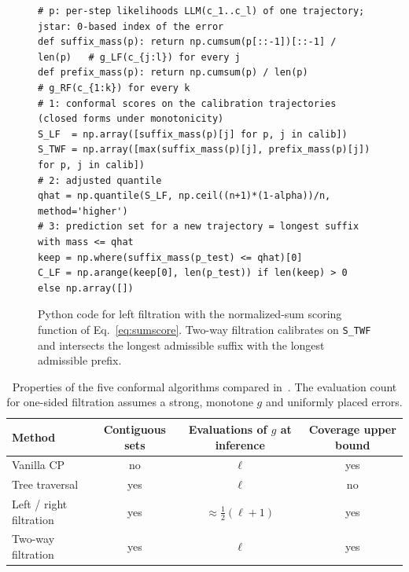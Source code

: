 \documentclass[11pt]{article}
\theoremstyle{definition}
\begin{document}
\begin{figure}[H]
\begin{snugshade}
\begin{Verbatim}
# p: per-step likelihoods LLM(c_1..c_l) of one trajectory; jstar: 0-based index of the error
def suffix_mass(p): return np.cumsum(p[::-1])[::-1] / len(p)   # g_LF(c_{j:l}) for every j
def prefix_mass(p): return np.cumsum(p) / len(p)               # g_RF(c_{1:k}) for every k
# 1: conformal scores on the calibration trajectories (closed forms under monotonicity)
S_LF  = np.array([suffix_mass(p)[j] for p, j in calib])
S_TWF = np.array([max(suffix_mass(p)[j], prefix_mass(p)[j]) for p, j in calib])
# 2: adjusted quantile
qhat = np.quantile(S_LF, np.ceil((n+1)*(1-alpha))/n, method='higher')
# 3: prediction set for a new trajectory = longest suffix with mass <= qhat
keep = np.where(suffix_mass(p_test) <= qhat)[0]
C_LF = np.arange(keep[0], len(p_test)) if len(keep) > 0 else np.array([])
\end{Verbatim}
\end{snugshade}
\caption{Python code for left filtration with the normalized-sum scoring function of Eq.~\eqref{eq:sumscore}. Two-way filtration calibrates on \texttt{S\_TWF} and intersects the longest admissible suffix with the longest admissible prefix.}
\label{fig:code-lf}
\end{figure}

\begin{table}[H]
\centering\small
\begin{tabular}{@{}lccc@{}}\toprule
Method & Contiguous sets & Evaluations of $g$ at inference & Coverage upper bound\\\midrule
Vanilla CP & no & $\ell$ & yes\\
Tree traversal~\cite{mortier2026} & yes & $\ell$ & no\\
Left / right filtration & yes & $\approx\frac12(\ell+1)$ & yes\\
Two-way filtration & yes & $\ell$ & yes\\\bottomrule
\end{tabular}
\caption{Properties of the five conformal algorithms compared in~\cite{caea}. The evaluation count for one-sided filtration assumes a strong, monotone $g$ and uniformly placed errors.}
\label{tab:algos}
\end{table}
\end{document}
